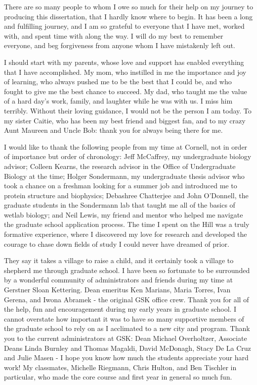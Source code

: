 \documentclass[phd,tocprelim]{cornell}
\DeclareRobustCommand{\gobblefive}[5]{}
\newcommand*{\SkipTocEntry}{\addtocontents{toc}{\gobblefive}}
\begin{document}
\SkipTocEntry\begin{acknowledgements}
There are so many people to whom I owe so much for their help on my journey to producing this dissertation, that I hardly know where to begin. It has been a long and fulfilling journey, and I am so grateful to everyone that I have met, worked with, and spent time with along the way. I will do my best to remember everyone, and beg forgiveness from anyone whom I have mistakenly left out. 

I should start with my parents, whose love and support has enabled everything that I have accomplished. My mom, who instilled in me the importance and joy of learning, who always pushed me to be the best that I could be, and who fought to give me the best chance to succeed. My dad, who taught me the value of a hard day's work, family, and laughter while he was with us. I miss him terribly. Without their loving guidance, I would not be the person I am today. To my sister Caitie, who has been my best friend and biggest fan, and to my crazy Aunt Maureen and Uncle Bob: thank you for always being there for me. 

I would like to thank the following people from my time at Cornell, not in order of importance but order of chronology: Jeff McCaffrey, my undergraduate biology advisor; Colleen Kearns, the research advisor in the Office of Undergraduate Biology at the time; Holger Sondermann, my undergraduate thesis advisor who took a chance on a freshman looking for a summer job and introduced me to protein structure and biophysics; Debashree Chatterjee and John O'Donnell, the graduate students in the Sondermann lab that taught me all of the basics of wetlab biology; and Neil Lewis, my friend and mentor who helped me navigate the graduate school application process. The time I spent on the Hill was a truly formative experience, where I discovered my love for research and developed the courage to chase down fields of study I could never have dreamed of prior. 

They say it takes a village to raise a child, and it certainly took a village to shepherd me through graduate school. I have been so fortunate to be surrounded by a wonderful community of administrators and friends during my time at Gerstner Sloan Kettering. Dean emeritus Ken Marians, Maria Torres, Ivan Gerena, and Iwona Abramek - the original GSK office crew. Thank you for all of the help, fun and encouragement during my early years in graduate school. I cannot overstate how important it was to have so many supportive members of the graduate school to rely on as I acclimated to a new city and program. Thank you to the current administrators at GSK: Dean Michael Overholtzer, Associate Deans Linda Burnley and Thomas Magaldi, David McDonagh, Stacy De La Cruz and Julie Masen - I hope you know how much the students appreciate your hard work!  My classmates, Michelle Riegmann, Chris Hulton, and Ben Tischler in particular, who made the core course and first year in general so much fun. 


\end{acknowledgements}
\end{document}

